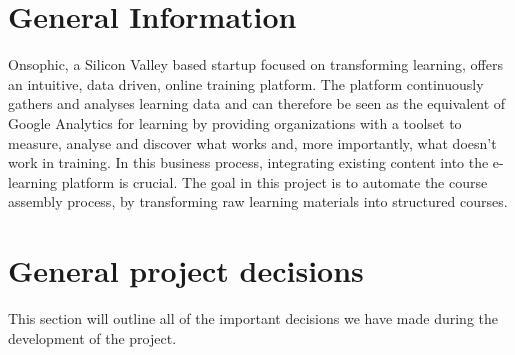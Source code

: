\documentclass[a4paper,12pt]{article}
\begin{document}
\section{General Information}
Onsophic, a Silicon Valley based startup focused on transforming learning, offers an intuitive, data driven, online training platform. The platform continuously gathers and analyses learning data and can
therefore be seen as the equivalent of Google Analytics for learning by providing organizations with a toolset to measure, analyse and discover what works and, more importantly, what doesn't work in training. In this business process, integrating existing content into the e­-learning
platform is crucial.
The goal in this project is to automate the course assembly process, by transforming raw learning materials into structured courses.
\section{General project decisions}
This section will outline all of the important decisions we have made during the development of the project.
\end{document}
